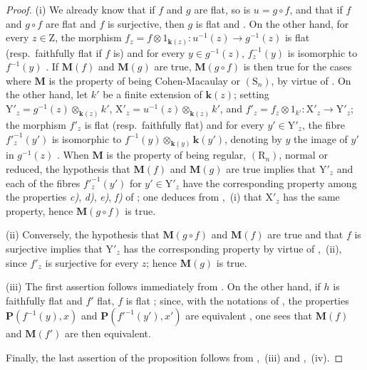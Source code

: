 \begin{proof}
(i) We already know that if $f$ and $g$ are flat, so is $u=g\circ f$, and that if $f$ and $g\circ f$ are flat and $f$ is surjective, then $g$ is flat  and . On the other hand, for every $z\in\mathrm{Z}$, the morphism $f_z=f\otimes 1_{\boldsymbol{k}(z)}:u^{-1}(z)\to g^{-1}(z)$ is flat (resp.\ faithfully flat if $f$ is) and for every $y\in g^{-1}(z)$, $f_z^{-1}(y)$ is isomorphic to $f^{-1}(y)$ . If $\boldsymbol{M}(f)$ and $\boldsymbol{M}(g)$ are true, $\boldsymbol{M}(g\circ f)$ is then true for the cases where $\boldsymbol{M}$ is the property of being Cohen-Macaulay or $(\mathrm{S}_n)$, by virtue of . On the other hand, let $k'$ be a finite extension of $\boldsymbol{k}(z)$; setting $\mathrm{Y}'_z=g^{-1}(z)\otimes_{\boldsymbol{k}(z)}k'$, $\mathrm{X}'_z=u^{-1}(z)\otimes_{\boldsymbol{k}(z)}k'$, and $f'_z=f_z\otimes 1_{k'}:\mathrm{X}'_z\to\mathrm{Y}'_z$; the morphism $f'_z$
is flat (resp.\ faithfully flat) and for every $y'\in\mathrm{Y}'_z$, the fibre $f'^{-1}_z(y')$ is isomorphic to $f^{-1}(y)\otimes_{\boldsymbol{k}(y)}\boldsymbol{k}(y')$, denoting by $y$ the image of $y'$ in $g^{-1}(z)$ . When $\boldsymbol{M}$ is the property of being regular, $(\mathrm{R}_n)$, normal or reduced, the hypothesis that $\boldsymbol{M}(f)$ and $\boldsymbol{M}(g)$ are true implies that $\mathrm{Y}'_z$ and each of the fibres $f'^{-1}_z(y')$ for $y'\in\mathrm{Y}'_z$ have the corresponding property among the properties \emph{c)}, \emph{d)}, \emph{e)}, \emph{f)} of ; one deduces from ,~(i) that $\mathrm{X}'_z$ has the same property, hence $\boldsymbol{M}(g\circ f)$ is true.

(ii) Conversely, the hypothesis that $\boldsymbol{M}(g\circ f)$ and $\boldsymbol{M}(f)$ are true and that $f$ is surjective implies that $\mathrm{Y}'_z$ has the corresponding property by virtue of ,~(ii), since $f'_z$ is surjective for every $z$; hence $\boldsymbol{M}(g)$ is true.

(iii) The first assertion follows immediately from . On the other hand, if $h$ is faithfully flat and $f'$ flat, $f$ is flat ; since, with the notations of , the properties $\boldsymbol{P}(f^{-1}(y),x)$ and $\boldsymbol{P}(f'^{-1}(y'),x')$ are equivalent , one sees that $\boldsymbol{M}(f)$ and $\boldsymbol{M}(f')$ are then equivalent.

Finally, the last assertion of the proposition follows from ,~(iii) and ,~(iv).
\end{proof}

